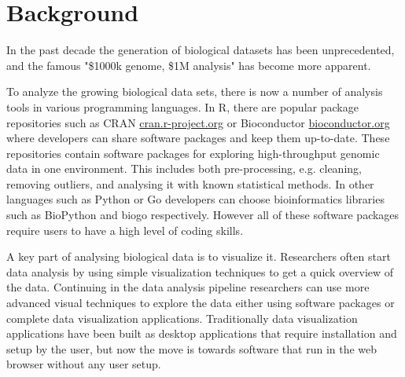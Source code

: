 \section*{Background}

In the past decade the generation of biological datasets has been unprecedented,
and the famous "\$1000k genome, \$1M analysis"\cite{} has become more apparent.


To analyze the growing biological data sets, there is now a number of analysis
tools in various programming languages.\cite{} In R, there are popular package
repositories such as CRAN \url{cran.r-project.org} or Bioconductor
\url{bioconductor.org} where developers can share software packages and keep
them up-to-date.  These repositories contain software packages for exploring
high-throughput genomic data in one environment. This includes both
pre-processing, e.g. cleaning, removing outliers, and analysing it with known
statistical methods. In other languages such as Python or Go developers can
choose bioinformatics libraries such as BioPython\cite{} and biogo\cite{}
respectively.  
However all of these software packages require users to have a
high level of coding skills. 

A key part of analysing biological data is to visualize it. Researchers often
start data analysis by using simple visualization techniques to get a quick
overview of the data. Continuing in the data analysis pipeline researchers can
use more advanced visual techniques to explore the data either using
software packages or complete data visualization applications. Traditionally
data visualization applications have been built as desktop applications that
require installation and setup by the user, but now the move is towards software
that run in the web browser without any user setup. 

